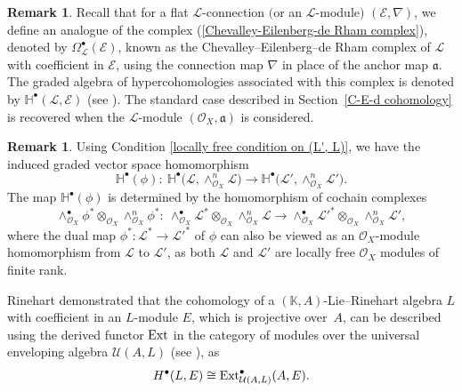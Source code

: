 \documentclass[pdftex]{sigma}
\numberwithin{equation}{section}
\theoremstyle{definition}
\newtheorem{Rem}[Thm]{Remark}
\begin{document}
\begin{Rem}
	Recall that for a flat $\mathcal{L}$-connection $($or an $\mathcal{L}$-module$)$ $(\mathcal{E}, \nabla)$, we define an analogue of the complex (\ref{Chevalley-Eilenberg-de Rham complex}), denoted by $\Omega^{\bullet}_{\mathcal{L}}(\mathcal{E})$, known as the Chevalley--Eilenberg--de Rham complex of $\mathcal{L}$ with coefficient in $\mathcal{E}$, using the connection map $\nabla$ in place of the anchor map $\mathfrak{a}$. The graded algebra of hypercohomologies associated with this complex is denoted by $\mathbb{H}^{\bullet}(\mathcal{L}, \mathcal{E})$ (see \cite{UB, BP, AS}). The standard case described in Section~\ref{C-E-d cohomology} is recovered when the $\mathcal{L}$-module $(\mathcal{O}_X, \mathfrak{a})$ is considered.
\end{Rem}

\begin{Rem} \label{on cohomologies}
	Using Condition \ref{locally free condition on (L', L)}, we have the induced graded vector space homomorphism
\[
\mathbb{H}^{\bullet}(\phi)\colon \ \mathbb{H}^{\bullet}\bigl(\mathcal{L}, \wedge^n_{\mathcal{O}_X} \mathcal{L}\bigr) \rightarrow \mathbb{H}^{\bullet}\bigl(\mathcal{L}', \wedge^n_{\mathcal{O}_X} \mathcal{L}'\bigr).
\]
	The map $\mathbb{H}^{\bullet}(\phi)$ is determined by the homomorphism of cochain complexes
\[
\wedge^\bullet_{\mathcal{O}_X} \phi^* \otimes _{\mathcal{O}_X}\wedge^n_{\mathcal{O}_X} \phi^*\colon \
	\wedge^\bullet_{\mathcal{O}_X} \mathcal{L}^* \otimes_{\mathcal{O}_X}\wedge^n_{\mathcal{O}_X} \mathcal{L} \rightarrow \wedge^\bullet_{\mathcal{O}_X} \mathcal{L}'^* \otimes_{\mathcal{O}_X}\wedge^n_{\mathcal{O}_X} \mathcal{L}',
\]
where the dual map $\phi^*\colon \mathcal{L}^* \rightarrow \mathcal{L}'^*$ of $\phi$ can also be viewed as an $\mathcal{O}_X$-module homomorphism from $\mathcal{L}$ to $\mathcal{L}'$, as both $\mathcal{L}$ and $\mathcal{L}'$ are locally free $\mathcal{O}_X$ modules of finite rank.
\end{Rem}

Rinehart demonstrated that the cohomology of a $(\mathbb{K}, A)$-Lie--Rinehart algebra $L$ with coefficient in an $L$-module $E$, which is projective over~$A$, can be described using the derived functor ${\rm Ext}$ in the category of modules over the universal enveloping algebra $\mathcal{U}(A, L)$ (see \cite{JH, GR}), as
\[
H^{\bullet}(L, E) \cong {\rm Ext}^{\bullet}_{\mathcal{U}(A, L)}(A, E).
\]
\end{document}
